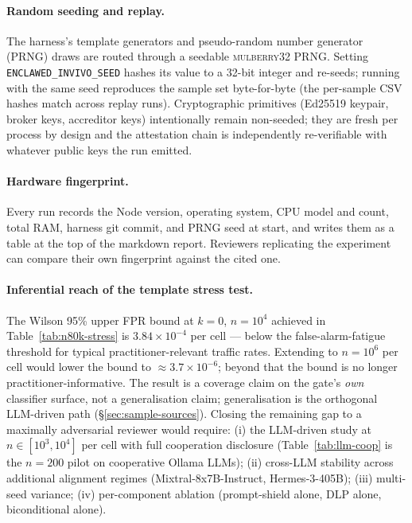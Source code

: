 \documentclass[11pt]{article}
\begin{document}
\paragraph{Random seeding and replay.} The harness's template
generators and pseudo-random number generator (PRNG) draws are
routed through a seedable \textsc{mulberry32} PRNG. Setting
\texttt{ENCLAWED\_INVIVO\_SEED} hashes its value to a 32-bit
integer and re-seeds; running with the same
seed reproduces the sample set byte-for-byte (the per-sample CSV
hashes match across replay runs). Cryptographic primitives (Ed25519
keypair, broker keys, accreditor keys) intentionally remain
non-seeded; they are fresh per process by design and the
attestation chain is independently re-verifiable with whatever
public keys the run emitted.

\paragraph{Hardware fingerprint.} Every run records the Node version,
operating system, CPU model and count, total RAM, harness git
commit, and PRNG seed at start, and writes them as a table at the
top of the markdown report. Reviewers replicating the experiment can
compare their own fingerprint against the cited one.

\paragraph{Inferential reach of the template stress test.} The
Wilson 95\% upper FPR bound at $k=0$, $n=10^4$ achieved in
Table~\ref{tab:n80k-stress} is $3.84\times 10^{-4}$ per cell ---
below the false-alarm-fatigue threshold for typical
practitioner-relevant traffic rates. Extending to $n=10^6$ per cell
would lower the bound to $\approx 3.7\times 10^{-6}$; beyond that
the bound is no longer practitioner-informative. The result is a
coverage claim on the gate's \emph{own} classifier surface, not a
generalisation claim; generalisation is the orthogonal LLM-driven
path (\S\ref{sec:sample-sources}). Closing the remaining gap to a
maximally adversarial reviewer would require: (i) the LLM-driven
study at $n\in[10^3, 10^4]$ per cell with full cooperation
disclosure (Table~\ref{tab:llm-coop} is the $n=200$ pilot on
cooperative Ollama LLMs); (ii) cross-LLM stability across
additional alignment regimes (Mixtral-8x7B-Instruct,
Hermes-3-405B); (iii) multi-seed variance; (iv) per-component
ablation (prompt-shield alone, DLP alone, biconditional alone).
\end{document}

